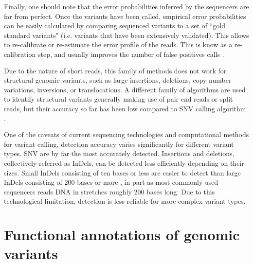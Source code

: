 Finally, one should note that the error probabilities inferred by the sequencers are far from perfect.  
Once the variants have been called, empirical error probabilities can be easily calculated \cite{mckenna2010genome} by comparing sequenced variants to a set of ``gold standard variants" (i.e. variants that have been extensively validated).  
This allows to re-calibrate or re-estimate the error profile of the reads.  This is know as a re-calibration step, and usually improves the number of false positives calls \cite{depristo2011framework}.

Due to the nature of short reads, this family of methods does not work for structural genomic variants, such as large insertions, deletions, copy number variations, inversions, or translocations.  
A different family of algorithms are used to identify structural variants generally making use of pair end reads or split reads, but their accuracy so far has been low compared to SNV calling algorithm \cite{o2013low}.

One of the caveats of current sequencing technologies and computational methods for variant calling, detection accuracy varies significantly for different variant types. SNV are by far the most accurately detected. 
Insertions and deletions, collectively referred as InDels, can be detected less efficiently depending on their sizes. 
Small InDels consisting of ten bases or less are easier to detect than large InDels consisting of 200 bases or more \cite{durbin2010map}, in part as most commonly used sequencers reads DNA in stretches roughly 200 bases long. 
Due to this technological limitation, detection is less reliable for more complex variant types.

\section{Functional annotations of genomic variants \label{sec:funann}}

